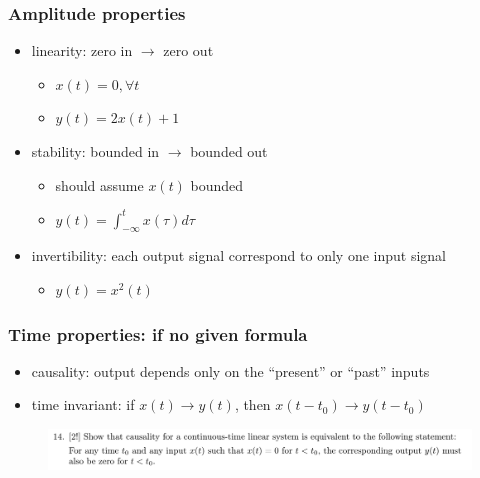 \documentclass{beamer}
\begin{document}
\begin{frame}
\frametitle{Amplitude properties}
\begin{itemize}
\item linearity: zero in $\rightarrow$ zero out 
\begin{itemize}
    \item $ x(t) = 0,  \forall t$
    \item $y(t) = 2x(t) +1$
\end{itemize}
\bigskip
\item stability: bounded in $\rightarrow$ bounded out
\begin{itemize}
    \item should assume $x(t)$ bounded
    \item $y(t) = \int_{-\infty}^{t} x (\tau) d \tau$
\end{itemize}
\bigskip
\item invertibility: each output signal correspond to only one input signal 
\begin{itemize}
    \item $y(t)=x^2(t)$
\end{itemize}
 
\end{itemize}
\end{frame}

\begin{frame}[t]
    \frametitle{Time properties: if no given formula}
    \begin{itemize}
        \item causality: output depends only on the ``present'' or ``past'' inputs
        \item time invariant: if $x(t) \rightarrow y(t)$, then $x(t-t_0) \rightarrow y(t-t_0)$
    \end{itemize}

    \begin{figure}
        \includegraphics[width = 1\linewidth]{hw1_q14.PNG}
    \end{figure}

\end{frame}
\end{document}
